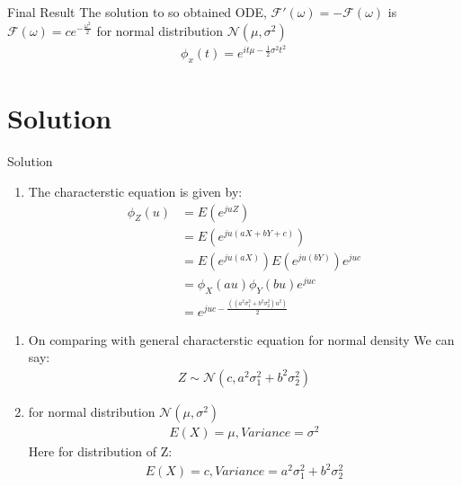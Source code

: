 \documentclass{beamer}
\providecommand{\e}[1]{\ensuremath{E\left(#1\right)}}
\providecommand{\brak}[1]{\ensuremath{\left(#1\right)}}
\newcounter{saveenumi}
\newcommand{\seti}{\setcounter{saveenumi}{\value{enumi}}}
\newcommand{\conti}{\setcounter{enumi}{\value{saveenumi}}}
\begin{document}
\begin{frame}{}
\begin{block}{Final Result}
The solution to so obtained ODE, $\mathcal{F}'\brak{\omega}=-\mathcal{F}\brak{\omega}$ is\\$\mathcal{F}\brak{\omega}=ce^{-\frac{\omega^2}{2}}$
for normal distribution $\mathcal{N}\brak{\mu,\sigma^2}$ 
\begin{align}
\phi_x\brak{t}=e^{it\mu-\frac{1}{2}\sigma^2t^2}
\end{align}
\end{block}
\end{frame}
\section{Solution}
\begin{frame}{Solution}
\begin{enumerate}
\item The characterstic equation is given by:
\begin{align}
\phi_Z \brak{u} &=\e{e^{juZ}} \\
                &=\e{e^{ju(aX+bY+c)}} \\
                &=\e{e^{ju(aX)}}\e{e^{ju(bY)}}e^{juc} \\
                &=\phi_X \brak{au}\phi_Y \brak{bu}e^{juc} \\
                &=e^{juc-\frac{\brak{(a^2\sigma_1^2+b^2\sigma_2^2)u^2}}{2}}
\end{align}
\seti
\end{enumerate}
\end{frame}{}
\begin{enumerate}
\conti
\item On comparing with  general characterstic equation for normal density We can say: 
\begin{align}
Z \sim \mathcal{N}\brak{c,a^2\sigma_1^2+b^2\sigma_2^2}
\end{align}
\item for normal distribution $\mathcal{N}\brak{\mu,\sigma^2}$ 
\begin{align}
\e{X}=\mu,Variance=\sigma^2
\end{align}
Here for distribution of Z:
\begin{align}
\e{X}=c,Variance=a^2\sigma_1^2+b^2\sigma_2^2
\end{align}
\end{enumerate}
\end{document}

